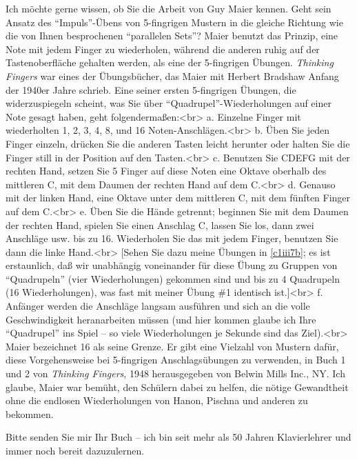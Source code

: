 \item \label{testimonials04}
Ich möchte gerne wissen, ob Sie die Arbeit von Guy Maier kennen.
Geht sein Ansatz des \enquote{Impuls}-Übens von 5-fingrigen Mustern in die gleiche Richtung wie die von Ihnen besprochenen \enquote{parallelen Sets}?
Maier benutzt das Prinzip, eine Note mit jedem Finger zu wiederholen, während die anderen ruhig auf der Tastenoberfläche gehalten werden, als eine der 5-fingrigen Übungen.
\textit{Thinking Fingers} war eines der Übungsbücher, das Maier mit Herbert Bradshaw Anfang der 1940er Jahre schrieb.
Eine seiner ersten 5-fingrigen Übungen, die widerzuspiegeln scheint, was Sie über \enquote{Quadrupel}-Wiederholungen auf einer Note gesagt haben, geht folgendermaßen:<br>
a. Einzelne Finger mit wiederholten 1, 2, 3, 4, 8, und 16 Noten-Anschlägen.<br>
b. Üben Sie jeden Finger einzeln, drücken Sie die anderen Tasten leicht herunter oder halten Sie die Finger still in der Position auf den Tasten.<br>
c. Benutzen Sie CDEFG mit der rechten Hand, setzen Sie 5 Finger auf diese Noten eine Oktave oberhalb des mittleren C, mit dem Daumen der rechten Hand auf dem C.<br>
d. Genauso mit der linken Hand, eine Oktave unter dem mittleren C, mit dem fünften Finger auf dem C.<br>
e. Üben Sie die Hände getrennt; beginnen Sie mit dem Daumen der rechten Hand, spielen Sie einen Anschlag C, lassen Sie los, dann zwei Anschläge usw. bis zu 16.
Wiederholen Sie das mit jedem Finger, benutzen Sie dann die linke Hand.<br>
[Sehen Sie dazu meine Übungen in \hyperref[c1iii7b]{\autoref{c1iii7b}}; es ist erstaunlich, daß wir unabhängig voneinander für diese Übung zu Gruppen von \enquote{Quadrupeln} (vier Wiederholungen) gekommen sind und bis zu 4 Quadrupeln (16 Wiederholungen), was fast mit meiner Übung \#1 identisch ist.]<br>
f. Anfänger werden die Anschläge langsam ausführen und sich an die volle Geschwindigkeit heranarbeiten müssen (und hier kommen glaube ich Ihre \enquote{Quadrupel} ins Spiel -- so viele Wiederholungen je Sekunde sind das Ziel).<br> Maier bezeichnet 16 als seine Grenze.
Er gibt eine Vielzahl von Mustern dafür, diese Vorgehensweise bei 5-fingrigen Anschlagsübungen zu verwenden, in Buch 1 und 2 von \textit{Thinking Fingers}, 1948 herausgegeben von Belwin Mills Inc., NY.
Ich glaube, Maier war bemüht, den Schülern dabei zu helfen, die nötige Gewandtheit ohne die endlosen Wiederholungen von Hanon, Pischna und anderen zu bekommen.


\item \label{testimonials05}
Bitte senden Sie mir Ihr Buch -- ich bin seit mehr als 50 Jahren Klavierlehrer und immer noch bereit dazuzulernen.


